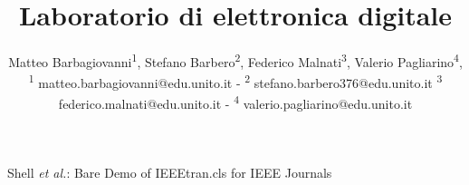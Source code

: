\documentclass[journal]{IEEEtran}
\begin{document}
\title{Laboratorio di elettronica digitale\\ 
}

\author{\begin{center}Matteo Barbagiovanni\textsuperscript{1},
        Stefano Barbero\textsuperscript{2},
        Federico Malnati\textsuperscript{3},
        Valerio Pagliarino\textsuperscript{4},
        {\small \\
        \textsuperscript{1}
        matteo.barbagiovanni@edu.unito.it -
        \textsuperscript{2}
        stefano.barbero376@edu.unito.it
        \textsuperscript{3}
        federico.malnati@edu.unito.it -
        \textsuperscript{4}
        valerio.pagliarino@edu.unito.it}
        \end{center}}%
        
{Shell \MakeLowercase{\textit{et al.}}: Bare Demo of IEEEtran.cls for IEEE Journals}

\maketitle


\end{document}
